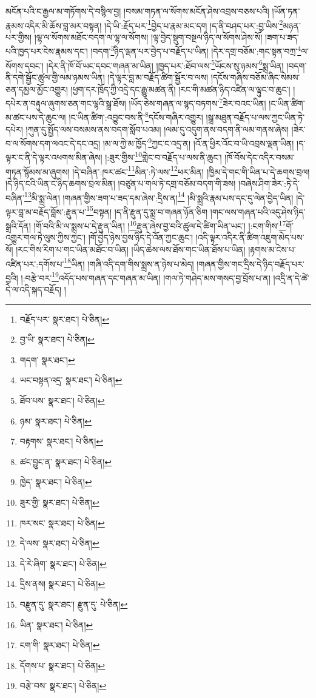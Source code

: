 མངོན་པའི་ང་རྒྱལ་མ་གཏོགས་དེ་བསྙིལ་བྱ། །བསམ་གཏན་ལ་སོགས་མངོན་ཤེས་འབྲས་བཅས་པའི། །ཡོན་ཏན་རྣམས་འདིར་མི་ཆོས་བླ་མར་བསྟན། །དེ་ཡི་:རྗོད་པར་\footnote{བརྗོད་པར་  སྣར་ཐང་།  པེ་ཅིན། }བྱེད་པ་རྣམ་མང་དག །ད་ནི་བཤད་པར་:བྱ་ཡིས་\footnote{བྱ་ཡི་  སྣར་ཐང་།  པེ་ཅིན། }མཉན་པར་གྱིས། །ལྷ་ལ་སོགས་མཐོང་བདག་ལ་ལྷ་ལ་སོགས། །ལྟ་བྱེད་སྡུག་བསྔལ་ཉིད་ལ་སོགས་ཤེས་སོ། །ཟག་པ་ཟད་པའི་ཁྱད་པར་ངེས་རྣམས་དང་། །བདག་\footnote{གདག་  སྣར་ཐང་། }ཉིད་ལྡན་པར་བྱེད་པ་བརྗོད་པ་ཡིན། །དེར་དགྲ་བཅོམ་:གང་སྟན་བཀྲ་\footnote{ཡང་བསྟན་འདྲ་  སྣར་ཐང་།  པེ་ཅིན། }ལ་སོགས་དབང་། །དེར་ནི་ཁོ་བོ་ཡང་དབང་གཞན་མ་ཡིན། །ཁྱད་པར་:ཐོབ་ལས་\footnote{ཐོབ་པས་  སྣར་ཐང་།  པེ་ཅིན། }ཡོངས་སུ་ཉམས་\footnote{ཉམ་  སྣར་ཐང་།  པེ་ཅིན། }སྨྲ་ཡིན། །བདག་ནི་དགེ་སྦྱོང་ཚུལ་གྱི་ལམ་ཉམས་ཡིན། །དེ་ལྟར་བླ་མ་བརྗོད་ཚིག་སྦྱོར་བ་ལས། །དངོས་གཞིས་བཅོམ་ཞིང་སེམས་ཅན་དམྱལ་མྱོང་འགྱུར། །ཕྱག་དར་ཁྲོད་ཀྱི་འདྲེ་དང་རྒྱུ་མཚན་ནི། །རང་གི་མཚན་ཉིད་འཛིན་ལ་ལྟུང་བ་ཆུང་། །དཔེར་ན་བརྟུལ་ཞུགས་ཅན་གང་ལྷའི་སྒྲ་ཐོས། །ཡོད་ཅེས་གཞན་ལ་སྙད་བཏགས་\footnote{བརྟགས་  སྣར་ཐང་།  པེ་ཅིན། }ཟེར་བའང་ཡིན། །ང་ཡིན་ཚིག་མ་ཚང་པས་དེ་ཆུང་ལ། །ང་ཡིན་ཚིག་:འབྱུང་བས་ནི་\footnote{ཚང་བྱུང་ན་  སྣར་ཐང་།  པེ་ཅིན། }དངོས་གཞིར་འགྱུར། །སྒྲ་མཐུན་བརྗོད་པ་ལས་ཀྱང་ཡིན་ཏེ་དཔེར། །ཀུན་དུ་སྤྱོད་ལས་བསམས་ནས་བདག་སློབ་པའམ། །ལམ་དུ་འདུག་ནས་བདག་ནི་ལམ་གནས་ཞེས། །ཟེར་བ་ལ་སོགས་དག་ལའང་དེ་དང་འདྲ། །མ་ལ་ཀྱེ་མ་ཁྱོད་\footnote{ཁྱེད་  སྣར་ཐང་།  པེ་ཅིན། }ཀྱང་ང་འདྲ་ན། །འོ་ན་ཕྱིར་འོང་བ་ཡི་འབྲས་ལྡན་ཡིན། །ད་ལྟར་ང་ནི་དེ་ལྟར་འཕགས་མིན་ཞེས། །:ཟུར་གྱིས་\footnote{ཟུར་གྱི་  སྣར་ཐང་།  པེ་ཅིན། }གླེང་བ་བརྗོད་པ་ལས་ནི་ཆུང་། །ཁོ་བོས་དེང་འདིར་བསམ་གཏན་སྙོམས་མ་ཞུགས། །དེ་བཞིན་:ཁར་ཚང་\footnote{ཁར་སང་  སྣར་ཐང་།  པེ་ཅིན། }མིན་:ཏེ་ལས་\footnote{དེ་ལས་  སྣར་ཐང་།  པེ་ཅིན། }ཕར་མིན། །ཁྱིམ་དེ་གང་གི་ཡིན་པ་དེ་ཆགས་བྲལ། །དེ་ཉིད་ངའི་ཡིན་ང་ཉིད་ཆགས་བྲལ་མིན། །བཙུན་པ་གལ་ཏེ་དགྲ་བཅོམ་བདག་གི་ཟས། །བཞེས་ཤིག་ཟེར་:ཏེ་དེ་བཞིན་\footnote{དེ་རེ་ཞིག་  སྣར་ཐང་།  པེ་ཅིན། }མི་སྨྲ་ལེན། །གཞན་གྱིས་ཟག་པ་ཟད་དམ་ཞེས་:དྲིས་ན།\footnote{དྲིས་ནས།  སྣར་ཐང་།  པེ་ཅིན། } །མི་སྨྲའི་རྣམ་པས་དང་དུ་ལེན་བྱེད་ཡིན། །དེ་ལྟར་བླ་མ་བརྗོད་བློས་:རྫུན་པ་\footnote{བརྫུན་དུ་  སྣར་ཐང་། རྫུན་དུ་  པེ་ཅིན། }བསྟན། །ད་ནི་རྫུན་དུ་སྨྲ་བ་གཞན་ཉོན་ཅིག །གང་ལས་གཞན་པའི་འདུ་ཤེས་ཉིད་སྒྲའི་དོན། །གོ་བའི་མི་ལ་སྨྲས་པ་དེ་རྫུན་ཡིན། །\footnote{ཡིན་  སྣར་ཐང་།  པེ་ཅིན། }རྫུན་ཞེས་བྱ་བའི་ཚུལ་དེ་ཚིག་ཡིན་ཡང་། །:ངག་གིས་\footnote{ངག་གི་  སྣར་ཐང་།  པེ་ཅིན། }གོ་འགྱུར་གལ་ཏེ་ལུས་ཀྱིས་ཀྱང་། །གོ་བྱེད་ཉེས་བྱས་ཉིད་དེ་འོན་ཀྱང་ཆུང་། །འདི་ལྟར་འདིར་ནི་ཚིག་འཇུག་མེད་པས་སོ། །རང་གིས་རིག་པ་གང་ཡིན་མཐོང་བ་ཡིན། །ཡིད་ཆེས་ལས་ཐོས་གང་ཡིན་ཐོས་པ་ཡིན། །རྟགས་མ་ངེས་པ་འཛིན་པར་:དགོས་པ་\footnote{དོགས་པ་  སྣར་ཐང་།  པེ་ཅིན། }ཡིན། །གཞི་འདི་དག་གིས་སྨྲས་ན་ཉེས་པ་མེད། །གཞན་གྱིས་གང་དྲིས་དེ་ཉིད་བརྗོད་པར་བྱའི། །:བརྩེ་བར་\footnote{བརྩེ་བས་  སྣར་ཐང་།  པེ་ཅིན། }འདོད་པས་གཞན་དང་གཞན་མ་ཡིན། །གལ་ཏེ་གཤེད་མས་གསད་བྱ་བྲོས་པ་ན། །འདྲི་ན་དེ་ཚེ་དེ་ལ་འདི་སྐད་བརྗོད། །
